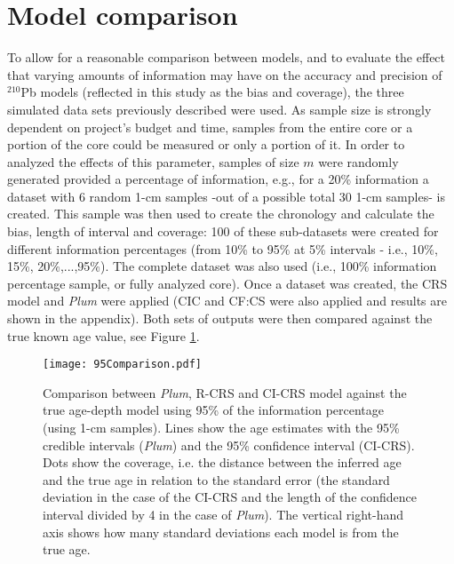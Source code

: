 \documentclass [10pt] {article}
\begin{document}

\section{Model comparison}

To allow for a reasonable comparison between models, and to evaluate the effect that varying amounts of information may have on the accuracy and precision of $^{210}$Pb models (reflected in this study as the bias and coverage), the three simulated data sets previously described were used. 
As sample size is strongly dependent on project's budget and time, samples from the entire core or a portion of the core could be measured or only a portion of it.
In order to analyzed the effects of this parameter, samples of size $m$ were randomly generated provided a percentage of information, e.g., for a 20\% information a dataset with 6 random 1-cm samples -out of a possible total 30 1-cm samples- is created.
This sample was then used to create the chronology and calculate the bias, length of interval and coverage:
100 of these sub-datasets were created for different information percentages (from 10\% to 95\% at 5\% intervals - i.e., 10\%, 15\%, 20\%,...,95\%). 
The complete dataset was also used (i.e., 100\% information percentage sample, or fully analyzed core).
Once a dataset was created, the CRS model and \textit{Plum} were applied (CIC and CF:CS were also applied and results are shown in the appendix).  
Both sets of outputs were then compared against the true known age value, see Figure \ref{fig:comparison1r}.

\begin{figure}[!]
	\centering
	\texttt{[image: 95Comparison.pdf]}
		\caption{Comparison between \textit{Plum}, R-CRS and CI-CRS model against the true age-depth model using 95\% of the information percentage (using 1-cm samples). Lines show the age estimates with the 95\% credible intervals (\textit{Plum}) and the 95\% confidence interval (CI-CRS). Dots show the coverage, i.e. the distance between the inferred age and the true age in relation to the standard error (the standard deviation in the case of the CI-CRS and the length of the confidence interval divided by 4 in the case of \textit{Plum}). The vertical right-hand axis shows how many standard deviations each model is from the true age.  }
		\label{fig:comparison1r}
\end{figure}
\end{document}
